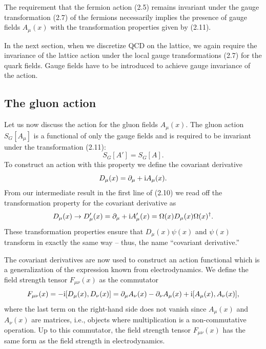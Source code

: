 The requirement that the fermion action (2.5) remains invariant under the
gauge transformation (2.7) of the fermions necessarily implies the presence
of gauge fields $A_\mu(x)$ with the transformation properties given by
(2.11).

In the next section, when we discretize QCD on the lattice, we again
require the invariance of the lattice action under the local gauge
transformations (2.7) for the quark fields. Gauge fields have to be
introduced to achieve gauge invariance of the action.

\subsection{The gluon action}

Let us now discuss the action for the gluon fields $A_\mu(x)$. The gluon
action $S_G[A_\mu]$ is a functional of only the gauge fields and is required
to be invariant under the transformation (2.11):
\begin{equation}
  S_G[A'] = S_G[A] .
\end{equation}
To construct an action with this property we define the covariant derivative
\begin{equation}
  D_\mu(x) = \partial_\mu + \mathrm{i} A_\mu(x) .
\end{equation}
From our intermediate result in the first line of (2.10) we read off the
transformation property for the covariant derivative as
\begin{equation}
  D_\mu(x) \to D'_\mu(x) = \partial_\mu + \mathrm{i} A'_\mu(x)
  = \Omega(x) D_\mu(x) \Omega(x)^\dagger .
\end{equation}
These transformation properties ensure that $D_\mu(x)\psi(x)$ and
$\psi(x)$ transform in exactly the same way -- thus, the name ``covariant
derivative.''

The covariant derivatives are now used to construct an action functional
which is a generalization of the expression known from electrodynamics. We
define the field strength tensor $F_{\mu\nu}(x)$ as the commutator
\begin{equation}
  F_{\mu\nu}(x) = -\mathrm{i} [D_\mu(x), D_\nu(x)]
  = \partial_\mu A_\nu(x) - \partial_\nu A_\mu(x)
    + \mathrm{i} [A_\mu(x), A_\nu(x)] ,
\end{equation}
where the last term on the right-hand side does not vanish since $A_\mu(x)$
and $A_\nu(x)$ are matrices, i.e., objects where multiplication is a
non-commutative operation. Up to this commutator, the field strength tensor
$F_{\mu\nu}(x)$ has the same form as the field strength in electrodynamics.

